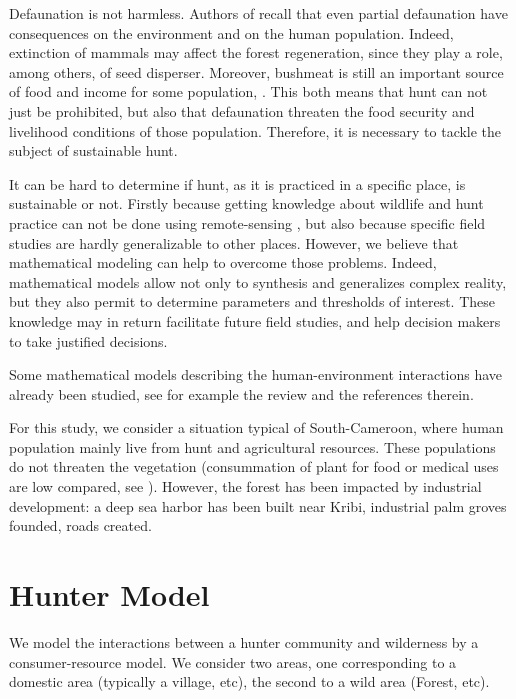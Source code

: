 \documentclass{article}
\begin{document}
Defaunation is not harmless. Authors of \cite{ripple_bushmeat_2016} recall that even partial defaunation have consequences on the environment and on the human population. Indeed, extinction of mammals may affect the forest regeneration, since they play a role, among others, of seed disperser. Moreover, bushmeat is still an important source of food and income for some population, \cite{jones_incentives_2019}. This both means that hunt can not just be prohibited, but also that defaunation threaten the food security and livelihood conditions of those population. Therefore, it is necessary to tackle the subject of sustainable hunt.

It can be hard to determine if hunt, as it is practiced in a specific place, is sustainable or not. Firstly because getting knowledge about wildlife and hunt practice can not be done using remote-sensing \cite{peres_detecting_2006}, but also because specific field studies are hardly generalizable to other places. However, we believe that mathematical modeling can help to overcome those problems. Indeed, mathematical models allow not only to synthesis and generalizes complex reality, but they also permit to determine parameters and thresholds of interest. These knowledge may in return facilitate future field studies, and help decision makers to take justified decisions.

Some mathematical models describing the human-environment interactions have already been studied, see for example the review \cite{fanuel_modelling_2023} and the references therein. 

For this study, we consider a situation typical of South-Cameroon, where human population mainly live from hunt and agricultural resources. These populations do not threaten the vegetation (consummation of plant for food or medical uses are low compared, see \cite{koppert_consommation_1996}). However, the forest has been impacted by industrial development: a deep sea harbor has been built near Kribi, industrial palm groves founded, roads created.





\section{Hunter Model}

We model the interactions between a hunter community and wilderness by a consumer-resource model. We consider two areas, one corresponding to a domestic area (typically a village, etc), the second to a wild area (Forest, etc).
\end{document}
